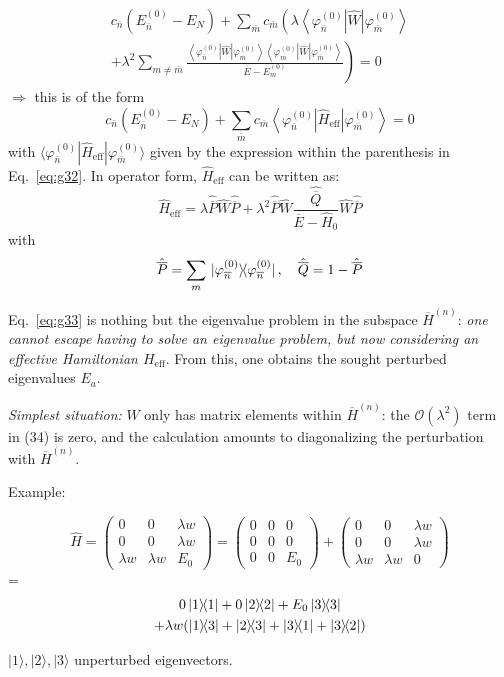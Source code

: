 \documentclass[12pt]{article}
\newcommand{\be}{\begin{equation}}
\newcommand{\ee}{\end{equation}}
\begin{document}
\be
\begin{gathered}
c_{\bar{n}}\left(E_{\bar{n}}^{(0)}-E_{N}\right)+
\sum_{\bar{m}} c_{\bar{m}}\left(\lambda\left\langle\varphi_{\bar{n}}^{(0)}|\hat{W}| \varphi_{\bar{m}}^{(0)}\right\rangle\right.\\
\left.+\lambda^{2} \sum_{m \neq \bar{m}} \frac{\left\langle\varphi_{\bar{n}}^{(0)}|\hat{W}| \varphi_{m}^{(0)}\right\rangle\left\langle\varphi_{m}^{(0)}|\hat{W}| \varphi_{\bar{m}}^{(0)}\right\rangle}{\overline{E}-E_{m}^{(0)}}\right)=0
\end{gathered}
\label{eq:g32}
\ee
$\Rightarrow$ this is of the form
\be
c_{\bar{n}}\left(E_{\bar{n}}^{(0)}-E_{N}\right)+
\sum_{\bar{m}} c_{\bar{m}}\left\langle\varphi_{\bar{n}}^{(0)}\left|\hat{H}_{\text {eff}}\right| \varphi_{\bar{m}}^{(0)}\right\rangle = 0
\label{eq:g33}
\ee
with $\langle\varphi_{\bar{n}}^{(0)}|\hat{H}_{\text{eff}}|\varphi_{\bar{m}}^{(0)}\rangle$ given by the expression
within the parenthesis in Eq.~\eqref{eq:g32}. In operator
form, $\hat{H}_{\text{eff}}$ can be written as:
\be
\hat{H}_{\text{eff}} = \lambda \hat{\overline{P}} \hat{W} \hat{\overline{P}} +
\lambda^{2}  \hat{\overline{P}} \hat{W} \frac{\hat{\overline{Q}}}{\overline{E} - \hat{H}_0} \hat{W}
\hat{\overline{P}}
\ee
with 
\be
\hat{\overline{P}} = \sum_m \op*{\varphi_{\overline{n}}^{(0)}},\quad \hat{\overline{Q}} = 1 - \hat{\overline{P}}
\ee

Eq.~\eqref{eq:g33} is nothing but the eigenvalue problem in
the subspace $\overline{H}^{(n)}$: 
\emph{one cannot escape having to solve an eigenvalue problem,
but now considering an effective Hamiltonian $H_{\text{eff}}$}.
From this, one obtains the sought
perturbed eigenvalues $E_a$.

\emph{Simplest situation:} $W$ only has matrix elements
within $\overline{H}^{(n)}$: the $\mathcal{O}(\lambda^2)$ term in (34) is zero, and the
calculation amounts to diagonalizing the
perturbation with $\overline{H}^{(n)}$.

Example:

\[
\hat{H}
=\begin{pmatrix}0 & 0 & \lambda w \\ 0 & 0 & \lambda w \\ \lambda w & \lambda w & E_{0}\end{pmatrix}
=\begin{pmatrix}0 & 0 & 0 \\ 0 & 0 & 0 \\ 0 & 0 & E_{0}\end{pmatrix}
+\begin{pmatrix}0 & 0 & \lambda w \\ 0 & 0 & \lambda w \\ \lambda w & \lambda w & 0\end{pmatrix}
\]
=
\[
\begin{gathered}
0\op{1} + 0\op{2} + E_{0}\op{3} \\ 
+\lambda w(\op{1}{3} + \op{2}{3} + \op{3}{1} + \op{3}{2})
\end{gathered}
\]

$|1\rangle,|2\rangle, |3\rangle$ unperturbed eigenvectors.
\end{document}
